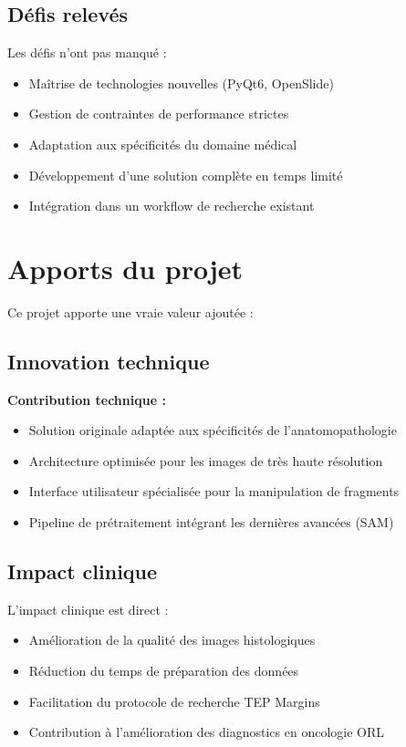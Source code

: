 \documentclass[11pt,a4paper]{report}
\begin{document}
\subsection{Défis relevés}

Les défis n'ont pas manqué :

\begin{itemize}
\item Maîtrise de technologies nouvelles (PyQt6, OpenSlide)
\item Gestion de contraintes de performance strictes
\item Adaptation aux spécificités du domaine médical
\item Développement d'une solution complète en temps limité
\item Intégration dans un workflow de recherche existant
\end{itemize}

\section{Apports du projet}

Ce projet apporte une vraie valeur ajoutée :

\subsection{Innovation technique}

\textbf{Contribution technique :}
\begin{itemize}
\item Solution originale adaptée aux spécificités de l'anatomopathologie
\item Architecture optimisée pour les images de très haute résolution
\item Interface utilisateur spécialisée pour la manipulation de fragments
\item Pipeline de prétraitement intégrant les dernières avancées (SAM)
\end{itemize}

\subsection{Impact clinique}

L'impact clinique est direct :

\begin{itemize}
\item Amélioration de la qualité des images histologiques
\item Réduction du temps de préparation des données
\item Facilitation du protocole de recherche TEP Margins
\item Contribution à l'amélioration des diagnostics en oncologie ORL
\end{itemize}
\end{document}

